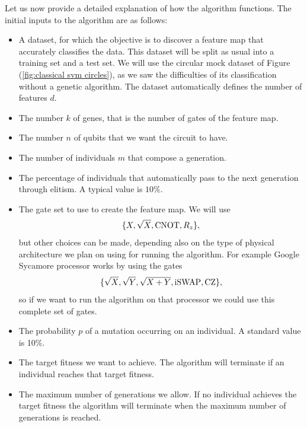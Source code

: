 \documentclass[12pt]{article}
\begin{document}
Let us now provide a detailed explanation of how the algorithm functions. The initial inputs to the algorithm are as follows:
\begin{itemize} 
    \item A dataset, for which the objective is to discover a feature map that accurately classifies the data. This dataset will be split as usual into a training set and a test set. We will use the circular mock dataset of Figure (\ref{fig:classical svm circles}), as we saw the difficulties of its classification without a genetic algorithm. The dataset automatically defines the number of features $d$.  
    \item The number $k$ of genes, that is the number of gates of the feature map. 
    \item The number $n$ of qubits that we want the circuit to have.
    \item The number of individuals $m$ that compose a generation.
    \item The percentage of individuals that automatically pass to the next generation through elitism. A typical value is $10\%$.
    \item The gate set to use to create the feature map. We will use $$\{X, \sqrt{X}, \textup{CNOT}, R_z\},$$ but other choices can be made, depending also on the type of physical architecture we plan on using for running the algorithm. For example Google Sycamore processor works by using the gates $$\{\sqrt{X}, \sqrt{Y},\sqrt{X+Y}, \textup{iSWAP}, \text{CZ}\},$$ so if we want to run the algorithm on that processor we could use this complete set of gates. 
    \item The probability $p$ of a mutation occurring on an individual. A standard value is 10\%.
    \item The target fitness we want to achieve. The algorithm will terminate if an individual reaches that target fitness. 
    \item The maximum number of generations we allow. If no individual achieves the target fitness the algorithm will terminate when the maximum number of generations is reached. 
\end{itemize}
\end{document}
